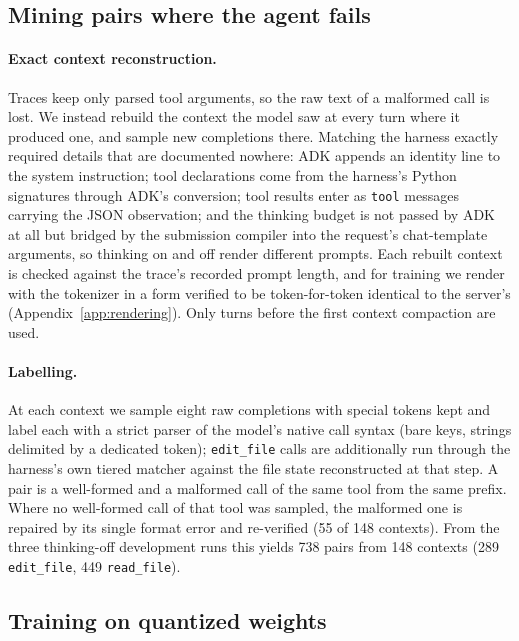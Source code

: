 \documentclass[11pt]{article}
\begin{document}
\subsection{Mining pairs where the agent fails}\label{sec:mining}

\paragraph{Exact context reconstruction.} Traces keep only parsed tool arguments, so the raw text of a malformed call is lost. We instead rebuild the context the model saw at every turn where it produced one, and sample new completions there. Matching the harness exactly required details that are documented nowhere: ADK appends an identity line to the system instruction; tool declarations come from the harness's Python signatures through ADK's conversion; tool results enter as \texttt{tool} messages carrying the JSON observation; and the thinking budget is not passed by ADK at all but bridged by the submission compiler into the request's chat-template arguments, so thinking on and off render different prompts. Each rebuilt context is checked against the trace's recorded prompt length, and for training we render with the tokenizer in a form verified to be token-for-token identical to the server's (Appendix~\ref{app:rendering}). Only turns before the first context compaction are used.

\paragraph{Labelling.} At each context we sample eight raw completions with special tokens kept and label each with a strict parser of the model's native call syntax (bare keys, strings delimited by a dedicated token); \texttt{edit\_file} calls are additionally run through the harness's own tiered matcher against the file state reconstructed at that step. A pair is a well-formed and a malformed call of the same tool from the same prefix. Where no well-formed call of that tool was sampled, the malformed one is repaired by its single format error and re-verified (55 of 148 contexts). From the three thinking-off development runs this yields 738 pairs from 148 contexts (289 \texttt{edit\_file}, 449 \texttt{read\_file}).

\subsection{Training on quantized weights}\label{sec:training}
\end{document}
